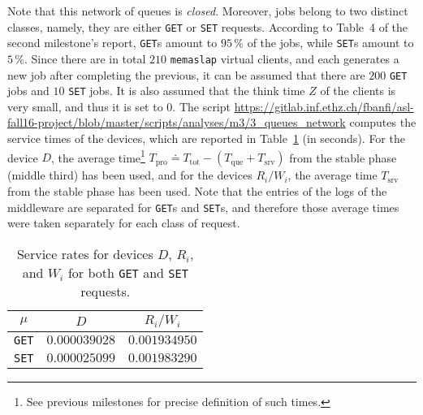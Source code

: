 \documentclass[11pt]{article}
\theoremstyle{definition}
\newcommand\Ttot{T_{\mathrm{tot}}}
\newcommand\Tque{T_{\mathrm{que}}}
\newcommand\Tsrv{T_{\mathrm{srv}}}
\newcommand\Tpro{T_{\mathrm{pro}}}
\newcommand\df\doteq
\renewcommand\t\texttt
\begin{document}
Note that this network of queues is \emph{closed}.
Moreover, jobs belong to two distinct classes, namely, they are either \t{GET} or \t{SET} requests.
According to Table~4 of the second milestone's report, \t{GET}s amount to $95\,\%$ of the jobs, while \t{SET}s amount to $5\,\%$.
Since there are in total $210$ \t{memaslap} virtual clients, and each generates a new job after completing the previous, it can be assumed that there are $200$ \t{GET} jobs and $10$ \t{SET} jobs.
It is also assumed that the think time $Z$ of the clients is very small, and thus it is set to $0$.
The script \url{https://gitlab.inf.ethz.ch/fbanfi/asl-fall16-project/blob/master/scripts/analyses/m3/3_queues_network} computes the service times of the devices, which are reported in Table~\ref{tab:3_mus} (in seconds).
For the device $D$, the average time\footnote{See previous milestones for precise definition of such times.} 
$\Tpro\df\Ttot-(\Tque+\Tsrv)$ from the stable phase (middle third) has been used, and for the devices $R_i/W_i$, the average time $\Tsrv$ from the stable phase has been used.
Note that the entries of the logs of the middleware are separated for \t{GET}s and \t{SET}s, and therefore those average times were taken separately for each class of request.

\begin{table}[h!]
    \centering
    \small
    {
        \begin{tabular}{|c|c|c|}
            \hline
            \rowcolor{Gray}
            $\mu$ & $D$ & $R_i/W_i$ \\
            \hline
            \cellcolor{Gray} \t{GET} & $0.000039028$ & $0.001934950$ \\
            \hline
            \cellcolor{Gray} \t{SET} & $0.000025099$ & $0.001983290$ \\
            \hline
        \end{tabular}
    }
    \caption{Service rates for devices $D$, $R_i$, and $W_i$ for both \t{GET} and \t{SET} requests.}
    \label{tab:3_mus}
\end{table}
\end{document}
